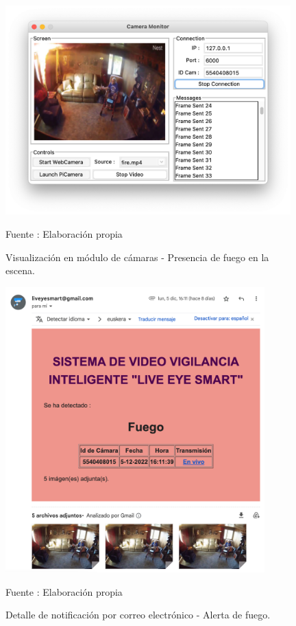 \begin{figure}[H]
    \begin{center}
        \includegraphics[width=11cm]{img/capitulo_6/fire.png}
    \end{center}
    \begin{center}
        \caption{Visualización en módulo de cámaras - Presencia de fuego en la escena.}
        Fuente : Elaboración propia
    \end{center}
\end{figure}

\begin{figure}[H]
    \begin{center}
        \includegraphics[width=10cm]{img/capitulo_6/mail_fire.png}
    \end{center}
    \begin{center}
        \caption{Detalle de notificación por correo electrónico - Alerta de fuego.}
        Fuente : Elaboración propia
    \end{center}
\end{figure}

